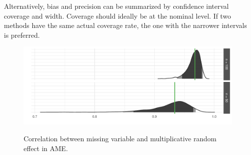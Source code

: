 Alternatively, bias and precision can be summarized by confidence interval coverage and width. Coverage should ideally be at the nominal level. If two methods have the same actual coverage rate, the one with the narrower intervals is preferred. 

\begin{figure}
	\centering
	\caption{Correlation between missing variable and multiplicative random effect in AME.}
	\label{fig:ameCorr}
	\includegraphics[width=1\textwidth]{ameSimCorr.pdf} \\
\end{figure}

